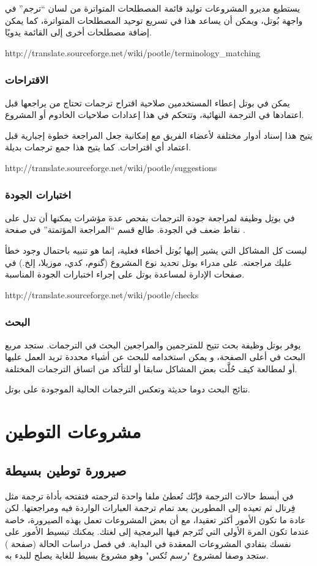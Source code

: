 يستطيع مديرو المشروعات توليد قائمة المصطلحات المتواترة من لسان “ترجم” في
واجهة بُوتل، ويمكن أن يساعد هذا في تسريع توحيد المصطلحات المتواترة، كما
يمكن إضافة مصطلحات أخرى إلى القائمة يدويًا.

http://translate.sourceforge.net/wiki/pootle/terminology\_matching

\subsection{الاقتراحات}
يمكن في بوتل إعطاء المستخدمين صلاحية اقتراح ترجمات تحتاج من يراجعها قبل
اعتمادها في الترجمة النهائية، وتتحكم في هذا إعدادات صلاحيات الخادوم أو
المشروع.

يتيح هذا إسناد أدوار مختلفة لأعضاء الفريق مع إمكانية جعل المراجعة خطوة
إجبارية قبل اعتماد أي اقتراحات. كما يتيح هذا جمع ترجمات بديلة.

http://translate.sourceforge.net/wiki/pootle/suggestions

\subsection{اختبارات الجودة}
في بوتِل وظيفة لمراجعة جودة الترجمات بفحص عدة مؤشرات يمكنها أن تدل على
نقاط ضعف في الجودة. طالع قسم “المراجعة المؤتمتة” في صفحة
.

ليست كل المشاكل التي يشير إليها بُوتل أخطاء فعلية، إنما هو تنبيه باحتمال
وجود خطأ عليك مراجعته. على مدراء بوتل تحديد نوع المشروع (گنوم، كدي،
موزيلا، إلخ.) في صفحات الإدارة لمساعدة بوتل على إجراء اختبارات الجودة
المناسبة.

http://translate.sourceforge.net/wiki/pootle/checks

\subsection{البحث}
يوفر بوتل وظيفة بحث تتيح للمترجمين والمراجعين البحث في الترجمات. ستجد
مربع البحث في أعلى الصفحة، و يمكن استخدامه للبحث عن أشياء محددة تريد
العمل عليها أو لمطالعة كيف حُلَّت بعض المشاكل سابقا أو للتأكد من اتساق
الترجمات المختلفة.

نتائج البحث دوما حديثة وتعكس الترجمات الحالية الموجودة على بوتل.

\chapter{مشروعات التوطين}
\section{صيرورة توطين بسيطة}
في أبسط حالات الترجمة فإنّك تُعطىٰ
ملفا واحدة لترجمته فتفتحه بأداة ترجمة مثل فِرتال ثم تعيده إلى المطورين
بعد تمام ترجمة العبارات الواردة فيه ومراجعتها. لكن عادة ما تكون الأمور
أكثر تعقيدا، مع أن بعض المشروعات تعمل بهذه الصيرورة، خاصة عندما تكون
المرة الأولى التي تُتَرجم فيها البرمجية إلى لغتك. يمكنك تبسيط الأمور
على نفسك بتفادي المشروعات المعقدة في البداية. في فصل دراسات الحالة
(صفحة ) ستجد وصفا لمشروع "رسم تُكس" وهو
مشروع بسيط للغاية يصلح للبدء به.

